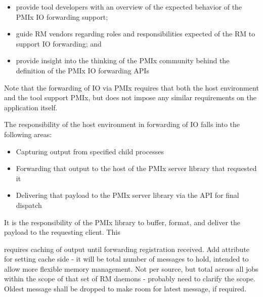 \begin{itemize}
    \item provide tool developers with an overview of the expected behavior of the \ac{PMIx} \ac{IO} forwarding support;
    \item guide \ac{RM} vendors regarding roles and responsibilities expected of the \ac{RM} to support \ac{IO} forwarding; and
    \item provide insight into the thinking of the \ac{PMIx} community behind the definition of the \ac{PMIx} \ac{IO} forwarding \acp{API}
\end{itemize}

Note that the forwarding of \ac{IO} via \ac{PMIx} requires that both the host environment and the tool support \ac{PMIx}, but does not impose any similar requirements on the application itself.

\advicermstart
The responsibility of the host environment in forwarding of \ac{IO} falls into the following areas:

\begin{itemize}
    \item Capturing output from specified child processes
    \item Forwarding that output to the host of the \ac{PMIx} server library that requested it
    \item Delivering that payload to the \ac{PMIx} server library via the  \ac{API} for final dispatch
\end{itemize}

\advicermend

\adviceimplstart
It is the responsibility of the \ac{PMIx} library to buffer, format, and deliver the payload to the requesting client. This

requires caching of output until forwarding registration received. Add attribute for setting cache side - it will be total number of messages to hold, intended to allow more flexible memory management. Not per source, but total across all jobs within the scope of that set of RM daemons - probably need to clarify the scope. Oldest message shall be dropped to make room for latest message, if required.

\adviceimplend

\subsection{}

